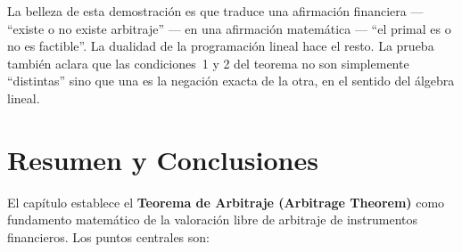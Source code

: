 \documentclass[12pt]{article}
\begin{document}
\begin{intuicion}
La belleza de esta demostraci\'on es que traduce una afirmaci\'on financiera
--- ``existe o no existe arbitraje'' --- en una afirmaci\'on matem\'atica
--- ``el primal es o no es factible''. La dualidad de la programaci\'on lineal
hace el resto. La prueba tambi\'en aclara que las condiciones~1 y 2 del teorema
no son simplemente ``distintas'' sino que una es la negaci\'on exacta de la
otra, en el sentido del \'algebra lineal.
\end{intuicion}

\section{Resumen y Conclusiones}

El cap\'itulo establece el \textbf{Teorema de Arbitraje (Arbitrage Theorem)}
como fundamento matem\'atico de la valoraci\'on libre de arbitraje de
instrumentos financieros. Los puntos centrales son:
\end{document}

